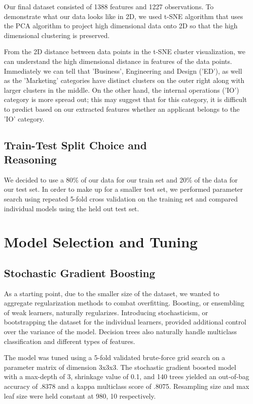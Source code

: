 \documentclass[9.5 pt]{article}
\begin{document}
Our final dataset consisted of 1388 features and 1227 observations. To demonstrate what our data looks like in 2D, we used t-SNE algorithm that uses the PCA algorithm to project high dimensional data onto 2D so that the high dimensional clustering is preserved. \par

From the 2D distance between data points in the t-SNE cluster visualization, we can understand the high dimensional distance in features of the data points. Immediately we can tell that 'Business', Engineering and Design ('ED'), as well as the 'Marketing'  categories have distinct clusters on the outer right along with larger clusters in the middle. On the other hand, the internal operations ('IO') category is more spread out; this may suggest that for this category, it is difficult to predict based on our extracted features whether an applicant belongs to the 'IO' category. 



\subsection{Train-Test Split Choice and \\ Reasoning}
We decided to use a 80\% of our data for our train set and 20\% of the data for our test set. In order to make up for a smaller test set, we performed parameter search using repeated 5-fold cross validation on the training set and compared individual models using the held out test set.


\section{Model Selection and Tuning}
\subsection{Stochastic Gradient Boosting}
As a starting point, due to the smaller size of the dataset, we wanted to aggregate regularization methods to combat overfitting. Boosting, or ensembling of weak learners, naturally regularizes. Introducing stochasticism, or bootstrapping the dataset for the individual learners, provided additional control over the variance of the model. Decision trees also naturally handle multiclass classification and different types of features.

The model was tuned using a 5-fold validated brute-force grid search on a parameter matrix of dimension 3x3x3. The stochastic gradient boosted model with a max-depth of 3, shrinkage value of 0.1, and 140 trees yielded an out-of-bag accuracy of .8378 and a kappa multiclass score of .8075. Resampling size and max leaf size were held constant at 980, 10 respectively.
\end{document}
